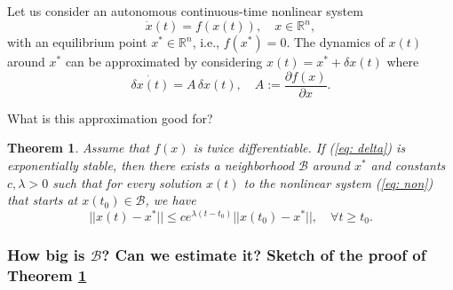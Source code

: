 \documentclass[11pt,a4paper,titlepage]{article}
\newtheorem{theorem}{Theorem}
\begin{document}
Let us consider an autonomous continuous-time nonlinear system
\begin{equation}
	\dot x(t) = f(x(t)), \quad x\in\mathbb{R}^n,
	\label{eq: non}
\end{equation}
with an equilibrium point $x^*\in\mathbb{R}^n$, i.e., $f(x^*) = 0$. The dynamics of $x(t)$ around $x^*$ can be approximated by considering $x(t) = x^* + \delta x(t)$ where
\begin{equation}
	\dot{\delta x(t)} = A\,\delta x(t), \quad A:=\frac{\partial f(x)}{\partial x}.
	\label{eq: delta}
\end{equation}

What is this approximation good for?

\begin{theorem}
	\label{thm: tayl}
	Assume that $f(x)$ is twice differentiable. If (\ref{eq: delta}) is exponentially stable, then there exists a neighborhood $\mathcal{B}$ around $x^*$ and constants $c, \lambda > 0$ such that for every solution $x(t)$ to the nonlinear system (\ref{eq: non}) that starts at $x(t_0)\in\mathcal{B}$, we have
	\begin{equation}
	||x(t) - x^*|| \leq ce^{\lambda(t-t_0)} ||x(t_0) - x^*||, \quad \forall t\geq t_0.
	\end{equation}
\end{theorem}

\subsubsection{How big is $\mathcal{B}$? Can we estimate it? Sketch of the proof of Theorem \ref{thm: tayl}}
\end{document}
